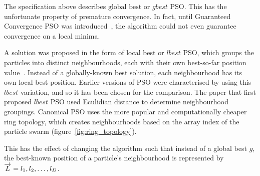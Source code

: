 \documentclass{csfourzero}
\newcommand{\rarrow}[1]{\overrightarrow{#1\vphantom{b}}}
\begin{document}
The specification above describes $\text{global best}$ or $gbest$ PSO\@. This
has the unfortunate property of premature convergence. In fact, until Guaranteed
Convergence PSO was introduced~\cite{vandenBergh:2002tk}, the algorithm could
not even guarantee convergence on a local minima.

A solution was proposed in the form of local best or $lbest$ PSO, which groups
the particles into distinct neighbourhoods, each with their own best-so-far
position value~\cite{Suganthan:1999iv}. Instead of a globally-known best
solution, each neighbourhood has its own local-best position. Earlier versions
of PSO were characterised by using this $lbest$ variation, and so it has been
chosen for the comparison. The paper that first proposed $lbest$ PSO used
Eculidian distance to determine neighbourhood groupings.  Canonical PSO uses the
more popular and computationally cheaper ring topology, which creates
neighbourhoods based on the array index of the particle swarm
(figure~\ref{fig:ring_topology}).

This has the effect of changing the algorithm such that instead
of a global best $g$, the best-known position of a particle's neighbourhood is
represented by $\rarrow{L} = l_1, l_2,\ldots,l_D$.
\end{document}

